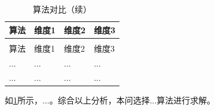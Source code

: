 \begin{longtable}{>{\centering\arraybackslash}p{}>{\centering\arraybackslash}p{}>{\centering\arraybackslash}p{}>{\centering\arraybackslash}p{}}
  \caption{算法对比}
  \label{tab:algoX} \\
  \toprule
  算法 & 维度1 & 维度2 & 维度3 \\
  \midrule
  \endfirsthead
  \caption{算法对比（续）} \\
  \toprule
  算法 & 维度1 & 维度2 & 维度3 \\
  \midrule
  \endhead
  \bottomrule
  \endfoot
  ... & ... & ... & ... \\
  ... & ... & ... & ... \\
\end{longtable}

如\ref{tab:algoX}所示，...。综合以上分析，本问选择...算法进行求解。
